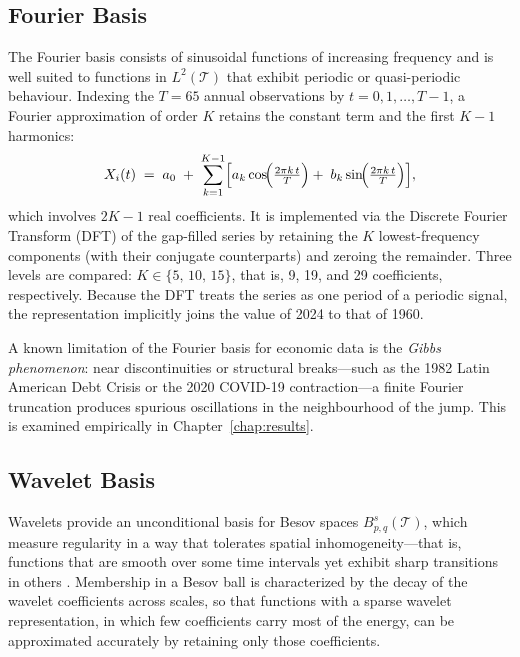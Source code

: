 \subsection{Fourier Basis}
\label{subsec:fourier}

The Fourier basis consists of sinusoidal functions of increasing frequency and
is well suited to functions in $L^2(\mathcal{T})$ that exhibit periodic or
quasi-periodic behaviour. Indexing the $T = 65$ annual observations by
$t = 0, 1, \dots, T-1$, a Fourier approximation of order $K$ retains the
constant term and the first $K-1$ harmonics:
\begin{equation}
    X_i(t) \;=\; a_0
    \;+\;\sum_{k=1}^{K-1}
    \Bigl[a_k\cos\!\Bigl(\tfrac{2\pi k\,t}{T}\Bigr)
    +\; b_k\sin\!\Bigl(\tfrac{2\pi k\,t}{T}\Bigr)\Bigr],
    \label{eq:fourier}
\end{equation}
which involves $2K-1$ real coefficients. It is implemented via the Discrete
Fourier Transform (DFT) of the gap-filled series by retaining the $K$
lowest-frequency components (with their conjugate counterparts) and zeroing
the remainder. Three levels are compared: $K \in \{5,\,10,\,15\}$, that is,
9, 19, and 29 coefficients, respectively. Because the DFT treats the series
as one period of a periodic signal, the representation implicitly joins the
value of 2024 to that of 1960.

A known limitation of the Fourier basis for economic data is the
\emph{Gibbs phenomenon}: near discontinuities or structural breaks---such as
the 1982 Latin American Debt Crisis or the 2020 COVID-19 contraction---a
finite Fourier truncation produces spurious oscillations in the neighbourhood
of the jump. This is examined empirically in Chapter~\ref{chap:results}.

\subsection{Wavelet Basis}
\label{subsec:wavelets}

Wavelets provide an unconditional basis for Besov spaces
$B_{p,q}^{s}(\mathcal{T})$, which measure regularity in a way that tolerates
spatial inhomogeneity---that is, functions that are smooth over some time
intervals yet exhibit sharp transitions in others \cite{donoho1998}. Membership
in a Besov ball is characterized by the decay of the wavelet coefficients
across scales, so that functions with a sparse wavelet representation, in which
few coefficients carry most of the energy, can be approximated accurately by
retaining only those coefficients.

